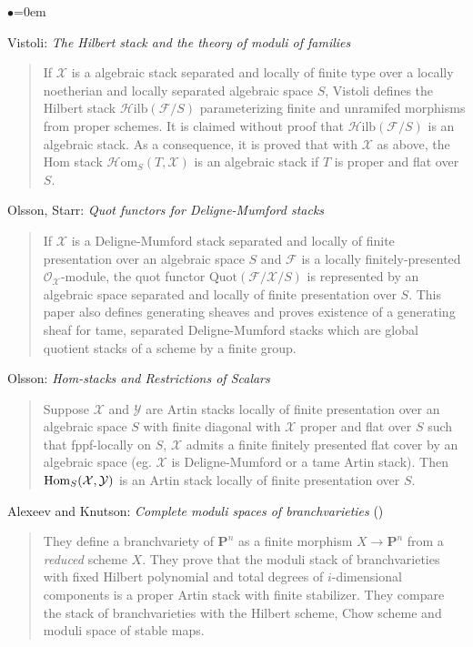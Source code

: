\begin{list}{$\bullet$}{\leftmargin=0em}
\item Vistoli: \emph{The Hilbert stack and the theory of moduli of families}
\cite{vistoli_hilbert}
\begin{quote}
If $\mathcal{X}$ is a algebraic stack separated and locally of finite type
over a locally noetherian and locally separated algebraic space $S$, Vistoli
defines the Hilbert stack $\mathcal{H}\text{ilb}(\mathcal{F} / S)$
parameterizing finite and unramifed morphisms from proper schemes.
It is claimed without proof that $\mathcal{H}\text{ilb}(\mathcal{F} / S)$
is an algebraic stack.  As a consequence, it is proved that with $\mathcal{X}$
as above, the Hom stack $\mathcal{H} \text{om}_S(T, \mathcal{X})$ is an
algebraic stack if $T$ is proper and flat over $S$.     
\end{quote}
\smallskip
\item Olsson, Starr: \emph{Quot functors for Deligne-Mumford stacks}
\cite{olsson-starr}
\begin{quote}
If $\mathcal{X}$ is a Deligne-Mumford stack separated and locally of finite
presentation over an algebraic space $S$ and $\mathcal{F}$ is a locally
finitely-presented $\mathcal{O}_\mathcal{X}$-module, the quot functor
$\text{Quot}(\mathcal{F} / \mathcal{X} / S)$ is represented by an algebraic
space separated and locally of finite presentation over $S$.  This paper
also defines generating sheaves and proves existence of a generating sheaf
for tame, separated Deligne-Mumford stacks which are global quotient stacks
of a scheme by a finite group.  
\end{quote}
\smallskip

\item Olsson: \emph{Hom-stacks and Restrictions of Scalars}
\cite{olsson_homstacks}
\begin{quote}
Suppose $\mathcal{X}$ and $\mathcal{Y}$ are Artin stacks locally of finite
presentation over an algebraic space $S$ with finite diagonal with
$\mathcal{X}$ proper and flat over $S$ such that fppf-locally on $S$,
$\mathcal{X}$ admits a finite finitely presented flat cover by an algebraic
space (eg. $\mathcal{X}$ is Deligne-Mumford or a tame Artin stack).
Then $\mathop{\rm Hom}\nolimits_S(\mathcal{X}, \mathcal{Y})$ is an Artin stack locally
of finite presentation over $S$.
\end{quote}
\smallskip

\item Alexeev and Knutson:  \emph{Complete moduli spaces of branchvarieties}
(\cite{alexeev-knutson})
\begin{quote}
They define a branchvariety of $\mathbf{P}^n$ as a finite morphism
$X \rightarrow \mathbf{P}^n$ from a \emph{reduced} scheme $X$.  They prove
that the moduli stack of branchvarieties with fixed Hilbert polynomial and
total degrees of $i$-dimensional components is a proper Artin stack with
finite stabilizer.  They compare the stack of branchvarieties with the
Hilbert scheme, Chow scheme and moduli space of stable maps.
\end{quote}
\smallskip


\end{list}

